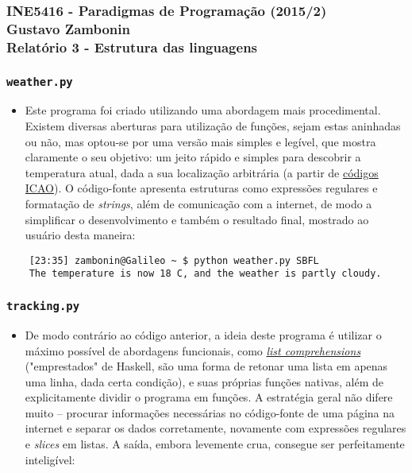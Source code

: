 \documentclass{article}
\begin{document}
\subsubsection*{INE5416 - Paradigmas de Programação (2015/2) \\
    Gustavo Zambonin \\
    Relatório 3 - Estrutura das linguagens \\
}

\subsubsection*{\texttt{weather.py}}
\begin{itemize}
    \item Este programa foi criado utilizando uma abordagem mais procedimental. Existem diversas aberturas para utilização de funções, sejam estas aninhadas ou não, mas optou-se por uma versão mais simples e legível, que mostra claramente o seu objetivo: um jeito rápido e simples para descobrir a temperatura atual, dada a sua localização arbitrária (a partir de \href{http://www.airlineupdate.com/content_public/codes/airportcodes/airport_icaocodes/airport_icao.htm}{códigos ICAO}). O código-fonte apresenta estruturas como expressões regulares e formatação de \textit{strings}, além de comunicação com a internet, de modo a simplificar o desenvolvimento e também o resultado final, mostrado ao usuário desta maneira:
\end{itemize}

\begin{verbatim}
    [23:35] zambonin@Galileo ~ $ python weather.py SBFL
    The temperature is now 18 C, and the weather is partly cloudy.
\end{verbatim}

\subsubsection*{\texttt{tracking.py}}
\begin{itemize}
    \item De modo contrário ao código anterior, a ideia deste programa é utilizar o máximo possível de abordagens funcionais, como \href{https://docs.python.org/3/howto/functional.html#generator-expressions-and-list-comprehensions}{\textit{list comprehensions}} ("emprestados" de Haskell, são uma forma de retonar uma lista em apenas uma linha, dada certa condição), e suas próprias funções nativas, além de explicitamente dividir o programa em funções. A estratégia geral não difere muito -- procurar informações necessárias no código-fonte de uma página na internet e separar os dados corretamente, novamente com expressões regulares e \textit{slices} em listas. A saída, embora levemente crua, consegue ser perfeitamente inteligível:
\end{itemize}
\end{document}
